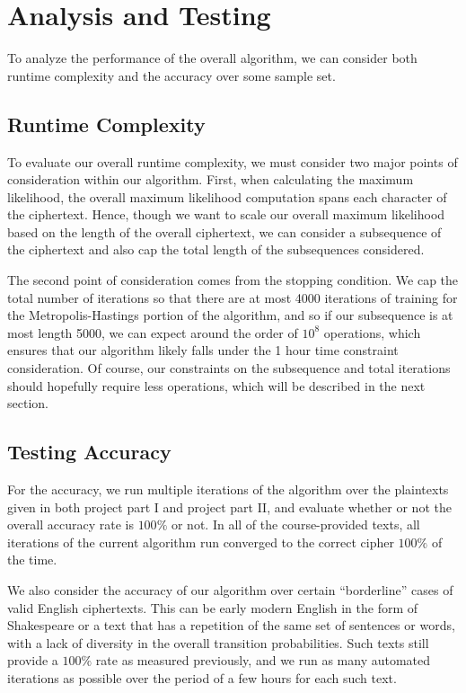 \documentclass[11pt]{paper}
\numberwithin{equation}{section} %
\numberwithin{figure}{section} %
\numberwithin{table}{section} %
\begin{document}
\section{Analysis and Testing}

To analyze the performance of the overall algorithm, we can consider both runtime complexity and the accuracy over some sample set.

\subsection{Runtime Complexity}

To evaluate our overall runtime complexity, we must consider two major points of consideration within our algorithm. First, when calculating the maximum likelihood, the overall maximum likelihood computation spans each character of the ciphertext. Hence, though we want to scale our overall maximum likelihood based on the length of the overall ciphertext, we can consider a subsequence of the ciphertext and also cap the total length of the subsequences considered.

\medskip

The second point of consideration comes from the stopping condition. We cap the total number of iterations so that there are at most 4000 iterations of training for the Metropolis-Hastings portion of the algorithm, and so if our subsequence is at most length 5000, we can expect around the order of $10^8$ operations, which ensures that our algorithm likely falls under the 1 hour time constraint consideration. Of course, our constraints on the subsequence and total iterations should hopefully require less operations, which will be described in the next section.

\subsection{Testing Accuracy}

For the accuracy, we run multiple iterations of the algorithm over the plaintexts given in both project part I and project part II, and evaluate whether or not the overall accuracy rate is $100\%$ or not. In all of the course-provided texts, all iterations of the current algorithm run converged to the correct cipher $100\%$ of the time.

\medskip

We also consider the accuracy of our algorithm over certain ``borderline'' cases of valid English ciphertexts. This can be early modern English in the form of Shakespeare or a text that has a repetition of the same set of sentences or words, with a lack of diversity in the overall transition probabilities. Such texts still provide a $100\%$ rate as measured previously, and we run as many automated iterations as possible over the period of a few hours for each such text. 
\end{document}
